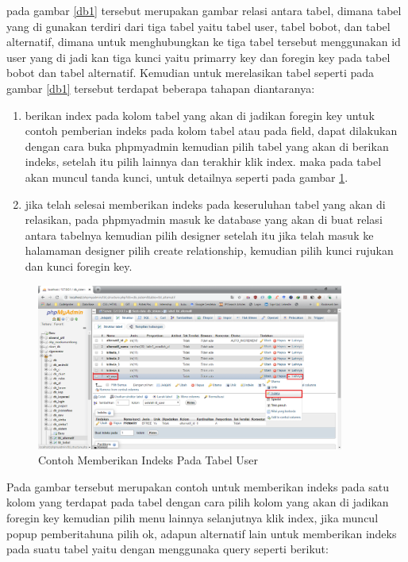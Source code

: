 pada gambar \ref{db1} tersebut merupakan gambar relasi antara tabel, dimana tabel yang di gunakan terdiri dari tiga tabel yaitu tabel user, tabel bobot, dan tabel alternatif, dimana untuk menghubungkan ke tiga tabel tersebut menggunakan id user yang di jadi kan tiga kunci yaitu primarry key dan foregin key pada tabel bobot dan tabel alternatif. Kemudian untuk merelasikan tabel seperti pada gambar \ref{db1} tersebut terdapat beberapa tahapan diantaranya:
\begin{enumerate}
\item berikan index pada kolom tabel yang akan di jadikan foregin key untuk contoh pemberian indeks pada kolom tabel atau pada field, dapat dilakukan dengan cara buka phpmyadmin kemudian pilih tabel yang akan di berikan indeks, setelah itu pilih lainnya dan terakhir klik index. maka pada tabel akan muncul tanda kunci, untuk detailnya seperti pada gambar \ref{db2}.

\item jika telah selesai memberikan indeks pada keseruluhan tabel yang akan di relasikan, pada phpmyadmin masuk ke database yang akan di buat relasi antara tabelnya kemudian pilih designer setelah itu jika telah masuk ke halamaman designer pilih create relationship, kemudian pilih kunci rujukan dan kunci foregin key.
\end{enumerate}
\pagebreak

\begin{figure}[!htbp]
	\centerline{\includegraphics[width=0.90\textwidth]{figures/db/2.png}}
	\caption{Contoh Memberikan Indeks Pada Tabel User}
	\label{db2}
\end{figure}

	Pada gambar tersebut merupakan contoh untuk memberikan indeks pada satu kolom yang terdapat pada tabel dengan cara pilih kolom yang akan di jadikan foregin key kemudian pilih menu lainnya selanjutnya klik index, jika muncul popup pemberitahuna pilih ok, adapun alternatif lain untuk memberikan indeks pada suatu tabel yaitu dengan menggunaka query seperti berikut:\par


